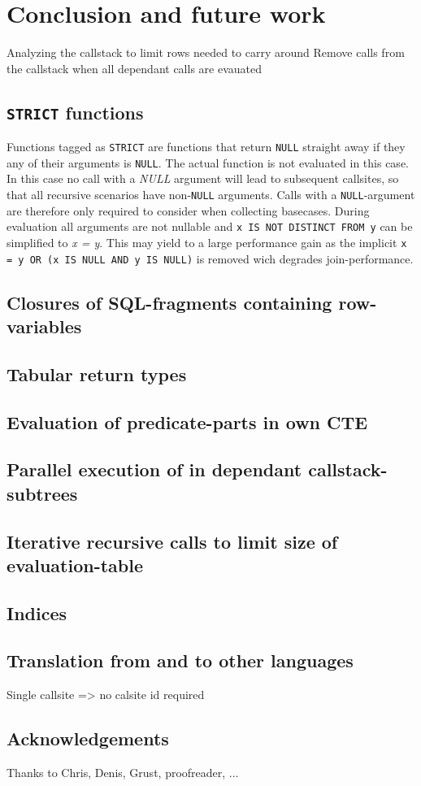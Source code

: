 \chapter{Conclusion and future work} \label{conclusion}
Analyzing the callstack to limit rows needed to carry around
Remove calls from the callstack when all dependant calls are evauated

\section{\texttt{STRICT} functions}
Functions tagged as \texttt{STRICT} are functions that return \texttt{NULL} straight away if they any of their arguments is \texttt{NULL}. The actual function is not evaluated in this case. In this case no call with a \textit{NULL} argument will lead to subsequent callsites, so that all recursive scenarios have non-\texttt{NULL} arguments. Calls with a \texttt{NULL}-argument are therefore only required to consider when collecting basecases. During evaluation all arguments are not nullable and \texttt{x IS NOT DISTINCT FROM y} can be simplified to \textit{x = y}. This may yield to a large performance gain as the implicit \texttt{x = y OR (x IS NULL AND y IS NULL)} is removed wich degrades join-performance.

\section{Closures of SQL-fragments containing row-variables}
\section{Tabular return types}
\section{Evaluation of predicate-parts in own CTE}
\section{Parallel execution of in dependant callstack-subtrees}
\section{Iterative recursive calls to limit size of evaluation-table}
\section{Indices}
\section{Translation from and to other languages}

Single callsite => no calsite id required

\section*{Acknowledgements}
Thanks to Chris, Denis, Grust, proofreader, ...